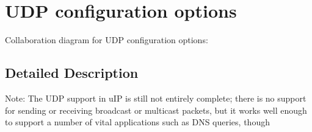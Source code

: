 \hypertarget{a00073}{
\section{UDP configuration options}
\label{a00073}
}


Collaboration diagram for UDP configuration options:

\subsection{Detailed Description}
\begin{Desc}
\item[Note:]The UDP support in u\-IP is still not entirely complete; there is no support for sending or receiving broadcast or multicast packets, but it works well enough to support a number of vital applications such as DNS queries, though \end{Desc}


